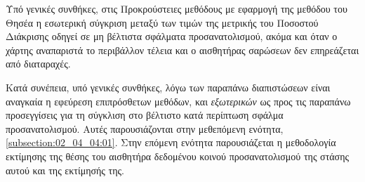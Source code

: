 \begin{remark}
  \label{remark:02_04_02:04}
  Υπό γενικές συνθήκες, στις Προκρούστειες μεθόδους με εφαρμογή της μεθόδου του
  Θησέα η εσωτερική σύγκριση μεταξύ των τιμών της μετρικής του Ποσοστού
  Διάκρισης οδηγεί σε μη βέλτιστα σφάλματα προσανατολισμού, ακόμα και όταν ο
  χάρτης αναπαριστά το περιβάλλον τέλεια και ο αισθητήρας σαρώσεων δεν
  επηρεάζεται από διαταραχές.
\end{remark}

Κατά συνέπεια, υπό γενικές συνθήκες, λόγω των παραπάνω διαπιστώσεων είναι
αναγκαία η εφεύρεση επιπρόσθετων μεθόδων, και \textit{εξωτερικών} ως προς τις
παραπάνω προσεγγίσεις για τη σύγκλιση στο βέλτιστο κατά περίπτωση σφάλμα
προσανατολισμού. Αυτές παρουσιάζονται στην μεθεπόμενη ενότητα,
\ref{subsection:02_04_04:01}. Στην επόμενη ενότητα παρουσιάζεται η μεθοδολογία
εκτίμησης της θέσης του αισθητήρα δεδομένου κοινού προσανατολισμού της στάσης
αυτού και της εκτίμησής της.
